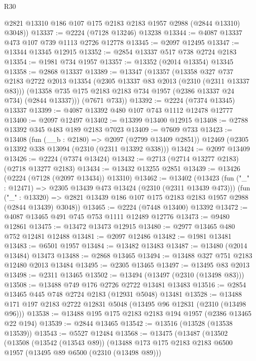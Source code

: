 \begin{lexlean}{R30}
\begin{coremodule}
      @2821 @13310 @186 @107 @175 @2183 @2183 @1957 @2988 (@2844 @13310) @3048))
@13337 := @2224 (@7128 @13246) @13238
@13344 := @4087 @13337 @473 @107 @739 @1113 @2726 @12778
@13345 := @2097 @12495
@13347 := @13344 @13345 @12915
@13352 := @2854 @13337 @517 @738 @2724 @2183
@13354 := @1981 @734 @1957
@13357 := @13352 (@2014 @13354) @13345
@13358 := @2868 @13337
@13389 := @13347
    (@13357
      (@13358
        @327
        @737
        @2183
        @2722
        @2013
        @13354
        (@2305 @13337 @83 @2013 (@2310 (@2311 @13337 @83)))
        (@13358 @735 @175 @2183 @2183 @734 @1957 (@2386 @13337 @24 @734) (@2844 @13337)))
      (@7671 @733))
@13392 := @2224 (@7374 @13345) @13337
@13399 := @4087 @13392 @480 @107 @743 @1112 @12478 @12777
@13400 := @2097 @12497
@13402 := @13399 @13400 @12915
@13408 := @2788 @13392 @345 @483 @189 @2183 @7023
@13409 := @7609 @733
@13423 := @13408
    (fun (__b : @2180) => @2097 (@2799 @13409 @2851))
    @12469
    (@2305 @13392 @338 @13094 (@2310 (@2311 @13392 @338)))
@13424 := @2097 @13409
@13426 := @2224 (@7374 @13424)
@13432 := @2713 (@2714 @13277 @2183) (@2718 @13277 @2183)
@13434 := @13432 @13255 @2851
@13439 := @13426 (@2224 (@7128 (@2097 @13434)) @13310)
@13462 := @13402
    (@13423
      (fun ("_" : @12471) => @2305 @13439 @473 @13424 (@2310 (@2311 @13439 @473)))
      (fun ("_" : @13320) =>
      @2821 @13439 @186 @107 @175 @2183 @2183 @1957 @2988 (@2844 @13439) @3048))
@13465 := @2224 (@7448 @13400) @13392
@13472 := @4087 @13465 @491 @745 @753 @1111 @12489 @12776
@13473 := @9480 @12861
@13475 := @13472 @13473 @12915
@13480 := @2977 @13465 @480 @752 @12481 @12488
@13481 := @2097 @12486
@13482 := @1981 @13481
@13483 := @6501 @1957
@13484 := @13482 @13483
@13487 := @13480 (@2014 @13484) @13473
@13488 := @2868 @13465
@13494 := @13488 @327 @751 @2183 @12480 @2013 @13484
@13495 := @2305 @13465
@13497 := @13495 @83 @2013
@13498 := @2311 @13465
@13502 := @13494 (@13497 (@2310 (@13498 @83)))
@13508 := @13488 @749 @176 @2726 @2722 @13481 @13483
@13516 := @2854 @13465 @445 @748 @2724 @2183 (@12931 @5048) @13481
@13528 := @13488 @171 @197 @2183 @2722 @12831 @5048 (@13495 @96 @12831 (@2310 (@13498 @96)))
@13538 := @13488 @195 @175 @2183 @2183 @194 @1957 (@2386 @13465 @22 @194)
@13539 := @2844 @13465
@13542 := @13516 (@13528 (@13538 @13539))
@13543 := @5527 @12484
@13568 := @13475
    (@13487
      (@13502
        (@13508
          (@13542 (@13543 @89))
          (@13488
            @173
            @175
            @2183
            @2183
            @6500
            @1957
            (@13495 @89 @6500 (@2310 (@13498 @89)))

\end{coremodule}
\end{lexlean}
